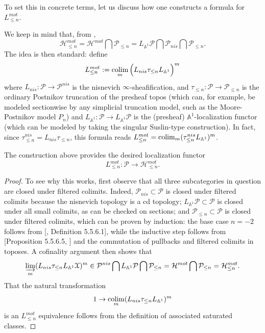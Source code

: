 \begin{con}\label{motivic truncation formulae}
      To set this in concrete terms, let us discuss how one constructs a formula for $L_{\leq n}^{mot}$.
      
    We keep in mind that, from , $$\mathcal{H}^{mot}_{\leq n}=\mathcal{H}^{mot}\bigcap\mathcal{P}_{\leq n} =L_{\mathbb{A}^1}\mathcal{P}\bigcap\mathcal{P}_{nis}\bigcap \mathcal{P}_{\leq n}.$$ The idea is then standard: define 
    $$L_{\leq n}^{mot}:=\operatorname*{colim}_{m}\Big (L_{nis}\tau_{\leq n}L_{\mathbb{A}^1}\Big)^m$$ where $L_{nis}:\mathcal{P}\to\mathcal{P}^{{nis}}$ is the nisnevich $\infty$-sheafification, and $\tau_{\leq n}: \mathcal{P}\to\mathcal{P}_{\leq n}$ is the ordinary Postnikov truncation of the presheaf topos (which can, for example, be modeled sectionwise by any simplicial truncation model, such as the Moore-Postnikov model $P_n$) and $L_{\mathbb{A}^1}: \mathcal{P}\to L_{\mathbb{A}^1}\mathcal{P}$ is the (presheaf) $\mathbb{A}^1$-localization functor (which can be modeled by taking the singular Suslin-type construction). In fact, since $\tau_{\leq n}^{nis}=L_{nis}\tau_{\leq n}$, this formula reads $L_{\leq n}^{mot}=\operatorname*{colim}_{m} (\tau^{nis}_{\leq n}L_{\mathbb{A}^1})^m$.
\end{con}
\begin{thm}\label{formula for motivic truncation}
    The construction above provides the desired localization functor $$L_{\leq n}^{mot}: \mathcal{P}\to \mathcal{H}^{mot}_{\leq n}.$$
\end{thm}
\begin{proof}
    To see why this works, first observe that all three subcategories in question are closed under filtered colimits. Indeed, $\mathcal{P}_{nis}\subset\mathcal{P}$ is closed under filtered colimits because the nisnevich topology is a cd topology; $L_{\mathbb{A}^1}\mathcal{P}\subset\mathcal{P}$ is closed under all small colimits, as can be checked on sections; and $ \mathcal{P}_{\leq n}\subset\mathcal{P}$ is closed under filtered colimits, which can be proven by induction: the base case $n=-2$ follows from [\cite{lurie2009higher}, Definition 5.5.6.1], while the inductive step follows from [Proposition 5.5.6.5, \cite{lurie2009higher}] and the commutation of pullbacks and filtered colimits in toposes. A cofinality argument then shows that $$\varinjlim_{m}(L_{nis}\tau_{\leq n}L_{\mathbb{A}^1}\EuScript{X})^m\in \mathcal{P}^{nis}\bigcap L_{\mathbb{A}^1}\mathcal{P}\bigcap\mathcal{P}_{\leq n}=\mathcal{H}^{mot}\bigcap\mathcal{P}_{\leq n}=\mathcal{H}^{mot}_{\leq n}.$$ That the natural transformation $$1\to \operatorname*{colim}_{m}(L_{nis}\tau_{\leq n}L_{\mathbb{A}^1})^m$$ is an $L_{\leq n}^{mot }$ equivalence follows from the definition of associated saturated classes.
\end{proof}



